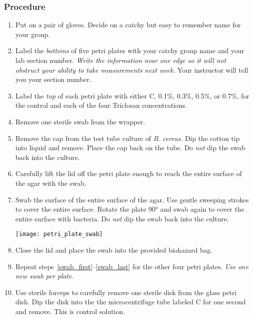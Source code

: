 \documentclass[12pt]{exam}
\begin{document}
\begin{questions}
\subsubsection*{Procedure}

	\begin{enumerate}
	
		\item Put on a pair of gloves. Decide on a catchy but easy to remember name for your group.  
			
		\item Label the \emph{bottoms} of five petri plates with your catchy group name and your lab section number. \emph{Write the information near one edge so it will not obstruct your ability to take measurements next week.} Your instructor will tell you your section number.
		
		\item Label the \emph{top} of each petri plate with either C, 0.1\%, 0.3\%, 0.5\%, or 0.7\%, for the control and each of the four Triclosan concentrations. 
		
		\item \label{swab_first} Remove one sterile swab from the wrapper. 
		
		\item Remove the cap from the test tube culture of \textit{B. cereus.} Dip the cotton tip into liquid and remove. Place the cap back on the tube. Do \emph{not} dip the swab back into the culture.
		
		\item Carefully lift the lid off the petri plate enough to reach the entire surface of the agar with the swab.
		
		\item Swab the surface of the entire surface of the agar. Use gentle sweeping strokes to cover the entire surface. Rotate the plate 90° and swab again to cover the entire surface with bacteria. Do \emph{not} dip the swab back into the culture.
		
		{\centering\texttt{[image: petri\_plate\_swab]}\par
		}
		
		\item \label{swab_last} Close the lid and place the swab into the provided biohazard bag.
		
		\item Repeat steps~\ref{swab_first}–\ref{swab_last} for the other four petri plates. \emph{Use one new swab per plate.}
		
		\item \label{disk_first} Use sterile forceps to carefully remove one sterile disk from the glass petri dish. Dip the disk into the the microcentrifuge tube labeled C for one second and remove. This is control solution.
		

\end{enumerate}
\end{questions}
\end{document}
